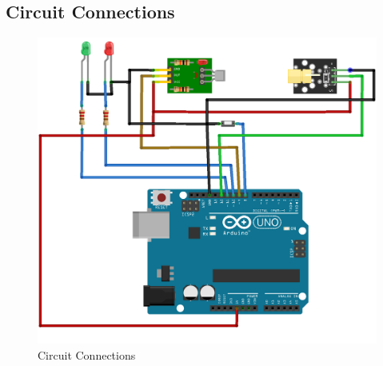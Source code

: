 \documentclass[12pt,a4paper]{article}
\begin{document}
\subsection{Circuit Connections}
\begin{figure}[h]
    \centering
    \includegraphics[width=0.5\linewidth]{bb.png}
    \caption{Circuit Connections}
\end{figure}
\end{document}
